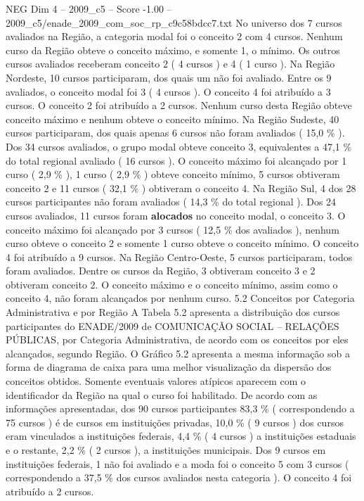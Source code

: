 \begin{textsample}{NEG Dim 4 – 2009\_c5 – Score -1.00 – 2009\_c5/enade\_2009\_com\_soc\_rp\_c9c58bdcc7.txt}
No universo dos 7 cursos avaliados na Região, a categoria modal foi o conceito 2 com 4 cursos.
Nenhum curso da Região obteve o conceito máximo, e somente 1, o mínimo.
Os outros cursos avaliados receberam conceito 2 ( 4 cursos ) e 4 ( 1 curso ).
Na Região Nordeste, 10 cursos participaram, dos quais um não foi avaliado.
Entre os 9 avaliados, o conceito modal foi 3 ( 4 cursos ).
O conceito 4 foi atribuído a 3 cursos.
O conceito 2 foi atribuído a 2 cursos.
Nenhum curso desta Região obteve conceito máximo e nenhum obteve o conceito mínimo.
Na Região Sudeste, 40 cursos participaram, dos quais apenas 6 cursos não foram avaliados ( 15,0 \% ).
Dos 34 cursos avaliados, o grupo modal obteve conceito 3, equivalentes a 47,1 \% do total regional avaliado ( 16 cursos ).
O conceito máximo foi alcançado por 1 curso ( 2,9 \% ), 1 curso ( 2,9 \% ) obteve conceito mínimo, 5 cursos obtiveram conceito 2 e 11 cursos ( 32,1 \% ) obtiveram o conceito 4.
Na Região Sul, 4 dos 28 cursos participantes não foram avaliados ( 14,3 \% do total regional ).
Dos 24 cursos avaliados, 11 cursos foram \textbf{alocados} no conceito modal, o conceito 3.
O conceito máximo foi alcançado por 3 cursos ( 12,5 \% dos avaliados ), nenhum curso obteve o conceito 2 e somente 1 curso obteve o conceito mínimo.
O conceito 4 foi atribuído a 9 cursos.
Na Região Centro-Oeste, 5 cursos participaram, todos foram avaliados.
Dentre os cursos da Região, 3 obtiveram conceito 3 e 2 obtiveram conceito 2.
O conceito máximo e o conceito mínimo, assim como o conceito 4, não foram alcançados por nenhum curso. 5.2 Conceitos por Categoria Administrativa e por Região A Tabela 5.2 apresenta a distribuição dos cursos participantes do ENADE/2009 de COMUNICAÇÃO SOCIAL – RELAÇÕES PÚBLICAS, por Categoria Administrativa, de acordo com os conceitos por eles alcançados, segundo Região.
O Gráfico 5.2 apresenta a mesma informação sob a forma de diagrama de caixa para uma melhor visualização da dispersão dos conceitos obtidos.
Somente eventuais valores atípicos aparecem com o identificador da Região na qual o curso foi habilitado.
De acordo com as informações apresentadas, dos 90 cursos participantes 83,3 \% ( correspondendo a 75 cursos ) é de cursos em instituições privadas, 10,0 \% ( 9 cursos ) dos cursos eram vinculados a instituições federais, 4,4 \% ( 4 cursos ) a instituições estaduais e o restante, 2,2 \% ( 2 cursos ), a instituições municipais.
Dos 9 cursos em instituições federais, 1 não foi avaliado e a moda foi o conceito 5 com 3 cursos ( correspondendo a 37,5 \% dos cursos avaliados nesta categoria ).
O conceito 4 foi atribuído a 2 cursos.

\end{textsample}

